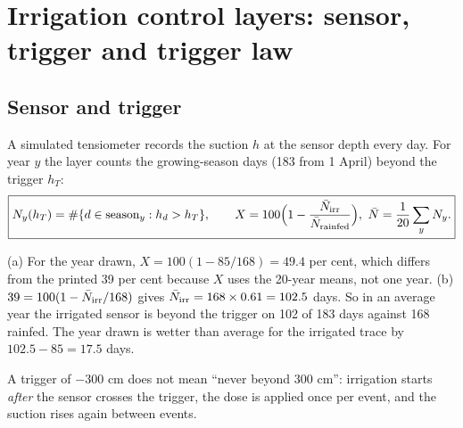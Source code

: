 \chapter{Irrigation control layers: sensor, trigger and trigger law}\label{ch:ctrl}

\section{Sensor and trigger}
A simulated tensiometer records the suction $h$ at the sensor depth every day. For year $y$ the layer counts the growing-season days (183 from 1 April) beyond the trigger $h_T$:
\begin{equation}\boxed{N_y(h_T)=\#\{d\in\text{season}_y:h_d>h_T\},\qquad X=100\Bigl(1-\frac{\bar N_{\rm irr}}{\bar N_{\rm rainfed}}\Bigr),\ \bar N=\frac1{20}\sum_yN_y.}\end{equation}

\sol  (a) For the year drawn, $X=100(1-85/168)=49.4$ per cent, which differs from the printed 39 per cent because $X$ uses the 20-year means, not one year. (b) $39=100(1-\bar N_{\rm irr}/168)$ gives $\bar N_{\rm irr}=168\times0.61=102.5$ days. So in an average year the irrigated sensor is beyond the trigger on 102 of 183 days against 168 rainfed. The year drawn is wetter than average for the irrigated trace by $102.5-85=17.5$ days.

 A trigger of $-300$ cm does not mean ``never beyond 300 cm'': irrigation starts \emph{after} the sensor crosses the trigger, the dose is applied once per event, and the suction rises again between events.


